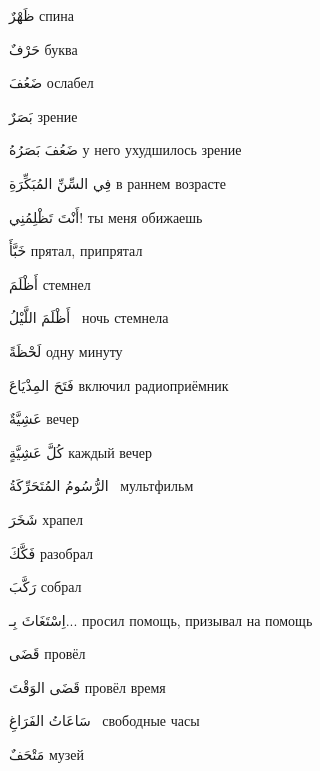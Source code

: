 \documentclass[a5paper]{article}
\newcommand\textstyleDropCaps[1]{#1}
\newcommand\textstyleCaptioncharacters[1]{#1}
\begin{document}
\textstyleCaptioncharacters{ظَهْرٌ }\textstyleDropCaps{спина‎}

\textstyleCaptioncharacters{حَرْفٌ }\textstyleDropCaps{буква‎}

\textstyleCaptioncharacters{ضَعُفَ }\textstyleDropCaps{ослабел‎}

\textstyleCaptioncharacters{بَصَرٌ }\textstyleDropCaps{зрение‎}

\textstyleCaptioncharacters{ضَعُفَ بَصَرُهُ }\textstyleDropCaps{у него ухуд­шилось зрение‎}

\textstyleCaptioncharacters{فِي السِّنِّ المُبَكِّرَةِ }\textstyleDropCaps{в раннем возрасте‎}

\textstyleCaptioncharacters{أَنْتَ تَظْلِمُنِي! }\textstyleDropCaps{ты меня обижаешь‎}

\textstyleCaptioncharacters{خَبَّأَ }\textstyleDropCaps{прятал, припрятал‎}

\textstyleCaptioncharacters{أَظْلَمَ }\textstyleDropCaps{стемнел‎}

\textstyleCaptioncharacters{أَظْلَمَ اللَّيْلُ \ }\textstyleDropCaps{ночь стем­нела ‎}

\textstyleCaptioncharacters{لَحْظَةً }\textstyleDropCaps{одну минуту‎}

\textstyleCaptioncharacters{فَتَحَ المِذْيَاعَ }\textstyleDropCaps{включил радиоприёмник‎}

\textstyleCaptioncharacters{عَشِيَّةٌ }\textstyleDropCaps{вечер‎}

\textstyleCaptioncharacters{كُلَّ عَشِيَّةٍ }\textstyleDropCaps{каждый вечер‎}

\textstyleCaptioncharacters{الرُّسُومُ المُتَحَرِّكَةُ \ }\textstyleDropCaps{мультфильм ‎}

\textstyleCaptioncharacters{شَخَرَ }\textstyleDropCaps{храпел‎}

\textstyleCaptioncharacters{فَكَّكَ }\textstyleDropCaps{разобрал‎}

\textstyleCaptioncharacters{رَكَّبَ }\textstyleDropCaps{собрал‎}

\textstyleCaptioncharacters{اِسْتَغَاثَ بِـ... }\textstyleDropCaps{просил по­мощь, призывал на помощь ‎}

\textstyleCaptioncharacters{قَضَى }\textstyleDropCaps{провёл‎}

\textstyleCaptioncharacters{قَضَى الوَقْتَ }\textstyleDropCaps{провёл вре­мя‎}

\textstyleCaptioncharacters{سَاعَاتُ الفَرَاغِ \ }\textstyleDropCaps{свобод­ные часы ‎}

\textstyleCaptioncharacters{مَتْحَفٌ }\textstyleDropCaps{музей‎}
\end{document}
